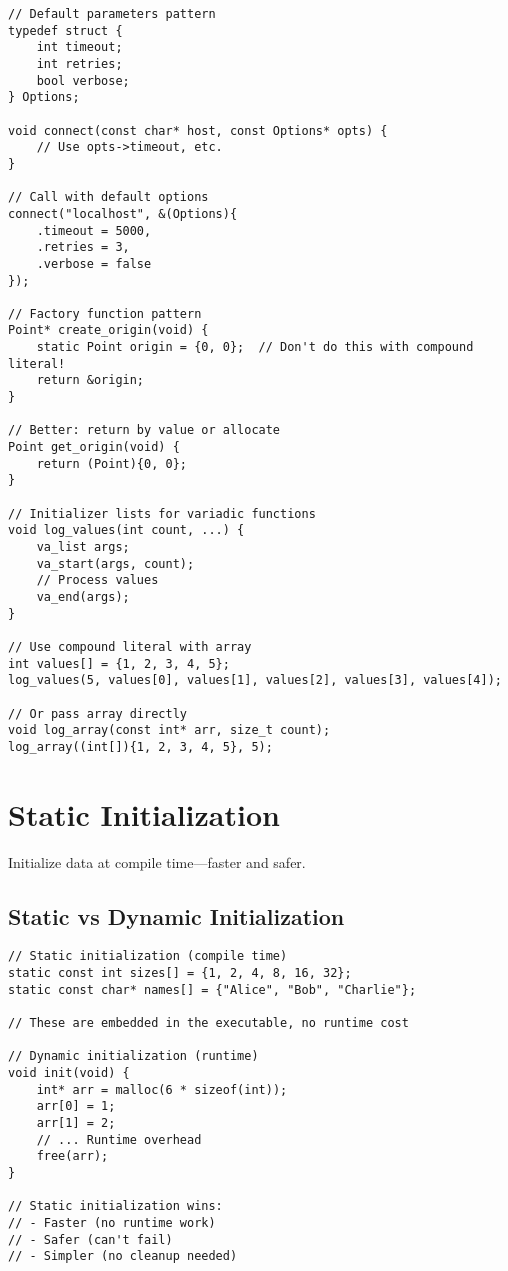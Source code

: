 \begin{lstlisting}
// Default parameters pattern
typedef struct {
    int timeout;
    int retries;
    bool verbose;
} Options;

void connect(const char* host, const Options* opts) {
    // Use opts->timeout, etc.
}

// Call with default options
connect("localhost", &(Options){
    .timeout = 5000,
    .retries = 3,
    .verbose = false
});

// Factory function pattern
Point* create_origin(void) {
    static Point origin = {0, 0};  // Don't do this with compound literal!
    return &origin;
}

// Better: return by value or allocate
Point get_origin(void) {
    return (Point){0, 0};
}

// Initializer lists for variadic functions
void log_values(int count, ...) {
    va_list args;
    va_start(args, count);
    // Process values
    va_end(args);
}

// Use compound literal with array
int values[] = {1, 2, 3, 4, 5};
log_values(5, values[0], values[1], values[2], values[3], values[4]);

// Or pass array directly
void log_array(const int* arr, size_t count);
log_array((int[]){1, 2, 3, 4, 5}, 5);
\end{lstlisting}

\section{Static Initialization}

Initialize data at compile time---faster and safer.

\subsection{Static vs Dynamic Initialization}

\begin{lstlisting}
// Static initialization (compile time)
static const int sizes[] = {1, 2, 4, 8, 16, 32};
static const char* names[] = {"Alice", "Bob", "Charlie"};

// These are embedded in the executable, no runtime cost

// Dynamic initialization (runtime)
void init(void) {
    int* arr = malloc(6 * sizeof(int));
    arr[0] = 1;
    arr[1] = 2;
    // ... Runtime overhead
    free(arr);
}

// Static initialization wins:
// - Faster (no runtime work)
// - Safer (can't fail)
// - Simpler (no cleanup needed)
\end{lstlisting}

